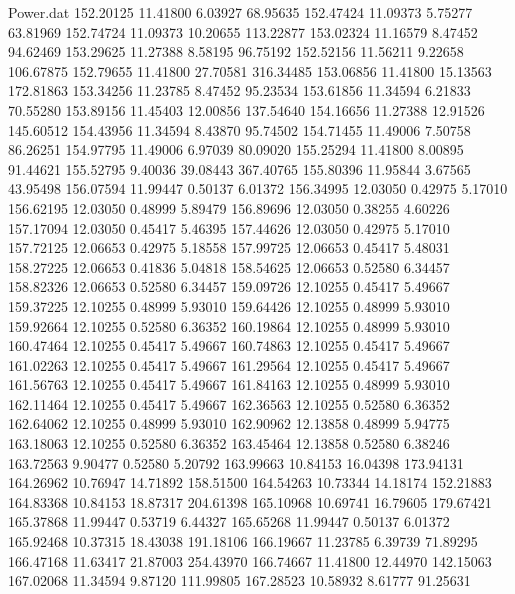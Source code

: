 \begin{filecontents}{Power.dat}
 152.20125   11.41800    6.03927   68.95635
 152.47424   11.09373    5.75277   63.81969
 152.74724   11.09373   10.20655  113.22877
 153.02324   11.16579    8.47452   94.62469
 153.29625   11.27388    8.58195   96.75192
 152.52156   11.56211    9.22658  106.67875
 152.79655   11.41800   27.70581  316.34485
 153.06856   11.41800   15.13563  172.81863
 153.34256   11.23785    8.47452   95.23534
 153.61856   11.34594    6.21833   70.55280
 153.89156   11.45403   12.00856  137.54640
 154.16656   11.27388   12.91526  145.60512
 154.43956   11.34594    8.43870   95.74502
 154.71455   11.49006    7.50758   86.26251
 154.97795   11.49006    6.97039   80.09020
 155.25294   11.41800    8.00895   91.44621
 155.52795    9.40036   39.08443  367.40765
 155.80396   11.95844    3.67565   43.95498
 156.07594   11.99447    0.50137    6.01372
 156.34995   12.03050    0.42975    5.17010
 156.62195   12.03050    0.48999    5.89479
 156.89696   12.03050    0.38255    4.60226
 157.17094   12.03050    0.45417    5.46395
 157.44626   12.03050    0.42975    5.17010
 157.72125   12.06653    0.42975    5.18558
 157.99725   12.06653    0.45417    5.48031
 158.27225   12.06653    0.41836    5.04818
 158.54625   12.06653    0.52580    6.34457
 158.82326   12.06653    0.52580    6.34457
 159.09726   12.10255    0.45417    5.49667
 159.37225   12.10255    0.48999    5.93010
 159.64426   12.10255    0.48999    5.93010
 159.92664   12.10255    0.52580    6.36352
 160.19864   12.10255    0.48999    5.93010
 160.47464   12.10255    0.45417    5.49667
 160.74863   12.10255    0.45417    5.49667
 161.02263   12.10255    0.45417    5.49667
 161.29564   12.10255    0.45417    5.49667
 161.56763   12.10255    0.45417    5.49667
 161.84163   12.10255    0.48999    5.93010
 162.11464   12.10255    0.45417    5.49667
 162.36563   12.10255    0.52580    6.36352
 162.64062   12.10255    0.48999    5.93010
 162.90962   12.13858    0.48999    5.94775
 163.18063   12.10255    0.52580    6.36352
 163.45464   12.13858    0.52580    6.38246
 163.72563    9.90477    0.52580    5.20792
 163.99663   10.84153   16.04398  173.94131
 164.26962   10.76947   14.71892  158.51500
 164.54263   10.73344   14.18174  152.21883
 164.83368   10.84153   18.87317  204.61398
 165.10968   10.69741   16.79605  179.67421
 165.37868   11.99447    0.53719    6.44327
 165.65268   11.99447    0.50137    6.01372
 165.92468   10.37315   18.43038  191.18106
 166.19667   11.23785    6.39739   71.89295
 166.47168   11.63417   21.87003  254.43970
 166.74667   11.41800   12.44970  142.15063
 167.02068   11.34594    9.87120  111.99805
 167.28523   10.58932    8.61777   91.25631

\end{filecontents}
